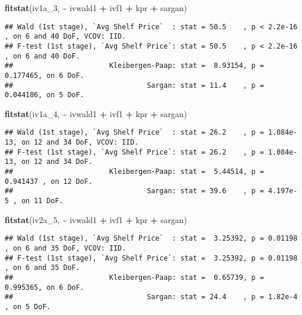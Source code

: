 \documentclass[
]{article}
\newenvironment{Shaded}{\begin{snugshade}}{\end{snugshade}}
\newcommand{\FunctionTok}[1]{\textcolor[rgb]{0.13,0.29,0.53}{\textbf{#1}}}
\newcommand{\NormalTok}[1]{#1}
\newcommand{\SpecialCharTok}[1]{\textcolor[rgb]{0.81,0.36,0.00}{\textbf{#1}}}
\begin{document}
\begin{Shaded}
\begin{Highlighting}[]
\FunctionTok{fitstat}\NormalTok{(iv1a\_3, }\SpecialCharTok{\textasciitilde{}}\NormalTok{ ivwald1 }\SpecialCharTok{+}\NormalTok{ ivf1 }\SpecialCharTok{+}\NormalTok{ kpr }\SpecialCharTok{+}\NormalTok{ sargan)}
\end{Highlighting}
\end{Shaded}

\begin{verbatim}
## Wald (1st stage), `Avg Shelf Price`  : stat = 50.5    , p < 2.2e-16 , on 6 and 40 DoF, VCOV: IID.
## F-test (1st stage), `Avg Shelf Price`: stat = 50.5    , p < 2.2e-16 , on 6 and 40 DoF.
##                       Kleibergen-Paap: stat =  8.93154, p = 0.177465, on 6 DoF.
##                                Sargan: stat = 11.4    , p = 0.044186, on 5 DoF.
\end{verbatim}

\begin{Shaded}
\begin{Highlighting}[]
\FunctionTok{fitstat}\NormalTok{(iv1a\_4, }\SpecialCharTok{\textasciitilde{}}\NormalTok{ ivwald1 }\SpecialCharTok{+}\NormalTok{ ivf1 }\SpecialCharTok{+}\NormalTok{ kpr }\SpecialCharTok{+}\NormalTok{ sargan)}
\end{Highlighting}
\end{Shaded}

\begin{verbatim}
## Wald (1st stage), `Avg Shelf Price`  : stat = 26.2    , p = 1.084e-13, on 12 and 34 DoF, VCOV: IID.
## F-test (1st stage), `Avg Shelf Price`: stat = 26.2    , p = 1.084e-13, on 12 and 34 DoF.
##                       Kleibergen-Paap: stat =  5.44514, p = 0.941437 , on 12 DoF.
##                                Sargan: stat = 39.6    , p = 4.197e-5 , on 11 DoF.
\end{verbatim}

\begin{Shaded}
\begin{Highlighting}[]
\FunctionTok{fitstat}\NormalTok{(iv2a\_5, }\SpecialCharTok{\textasciitilde{}}\NormalTok{ ivwald1 }\SpecialCharTok{+}\NormalTok{ ivf1 }\SpecialCharTok{+}\NormalTok{ kpr }\SpecialCharTok{+}\NormalTok{ sargan)}
\end{Highlighting}
\end{Shaded}

\begin{verbatim}
## Wald (1st stage), `Avg Shelf Price`  : stat =  3.25392, p = 0.01198 , on 6 and 35 DoF, VCOV: IID.
## F-test (1st stage), `Avg Shelf Price`: stat =  3.25392, p = 0.01198 , on 6 and 35 DoF.
##                       Kleibergen-Paap: stat =  0.65739, p = 0.995365, on 6 DoF.
##                                Sargan: stat = 24.4    , p = 1.82e-4 , on 5 DoF.
\end{verbatim}
\end{document}
